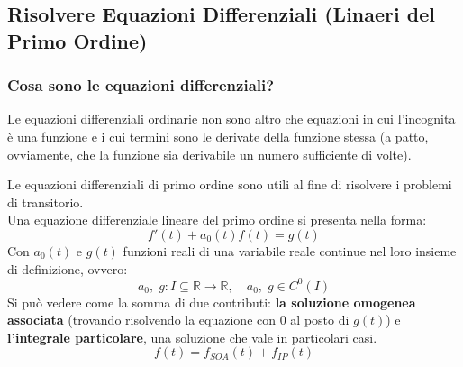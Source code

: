 \documentclass[../main.tex]{subfiles}
\begin{document}
	\subsection{Risolvere Equazioni Differenziali (Linaeri del Primo Ordine)}
	\subsubsection{Cosa sono le equazioni differenziali?}
	\begin{definition}
		Le equazioni differenziali ordinarie non sono altro che equazioni in cui l'incognita è una funzione e i cui termini sono le derivate della funzione stessa (a patto, ovviamente, che la funzione sia derivabile un numero sufficiente di volte).
	\end{definition}
	Le equazioni differenziali di primo ordine sono utili al fine di risolvere i problemi di transitorio.\\
	Una equazione differenziale lineare del primo ordine si presenta nella forma:
	\begin{equation}
		f'(t)+a_0(t)f(t)=g(t)	
	\end{equation}
	Con $a_0(t)$ e $g(t)$ funzioni reali di una variabile reale continue nel loro insieme di definizione, ovvero:
	\begin{equation}
		a_0, \; g:I\subseteq\mathbb{R}\to\mathbb{R},\quad a_0, \; g \in C^0(I)
	\end{equation}
	Si può vedere come la somma di due contributi: \textbf{la soluzione omogenea associata} (trovando risolvendo la equazione con $0$ al posto di $g(t)$) e \textbf{l'integrale particolare}, una soluzione che vale in particolari casi.
	\begin{equation}
		f(t)=f_{SOA}(t)+f_{IP}(t)	
	\end{equation}
\end{document}
